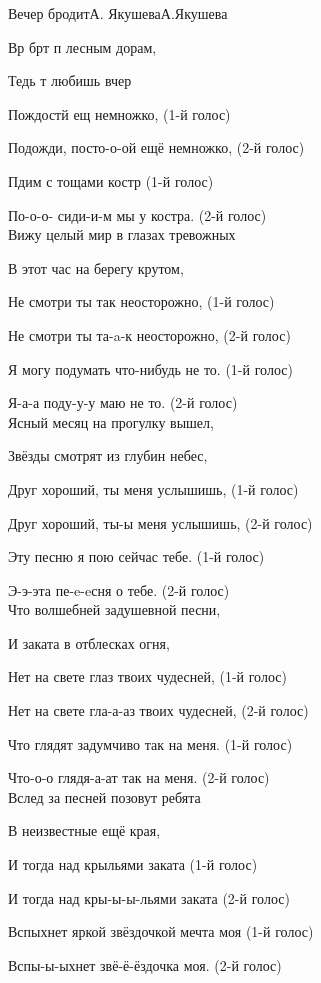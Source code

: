 \documentclass[11pt,a5paper]{book}
\begin{document}
\begin{song}{Вечер бродит}{}{А. Якушева}{А.Якушева}{}{}

Вр брт п лесным дорам,\par
Тедь т любишь вчер\par
Пождостй ещ немножко,    	(1-й голос)\par
Подожди, посто-о-ой ещё немножко,     							(2-й голос)\par
Пдим с тощами  костр  	(1-й голос)\par
По-о-о- сиди-и-м мы у костра.         							(2-й голос)\\
 
Вижу целый мир в глазах тревожных \par
В этот час на берегу крутом,\par
Не смотри ты так неосторожно,   	    (1-й голос)\par
Не смотри ты та-a-к неосторожно,     (2-й голос)\par
Я могу подумать что-нибудь не то.    (1-й голос)\par
Я-а-а поду-у-у маю не то.            (2-й голос)\\
 
Ясный месяц на прогулку вышел,\par
Звёзды смотрят из глубин небес,\par
Друг хороший, ты меня услышишь, 		(1-й голос)\par
Друг хороший, ты-ы меня услышишь, 	(2-й голос)\par
Эту песню я пою сейчас тебе. 		(1-й голос)\par
Э-э-эта пе-e-eсня о тебе. 			(2-й голос)\\
 
Что волшебней задушевной песни,\par
И заката в отблесках огня,\par
Нет на свете глаз твоих чудесней, 	(1-й голос)\par
Нет на свете гла-а-аз твоих чудесней, 	(2-й голос)\par
Что глядят задумчиво так на меня. 	(1-й голос)\par
Что-о-о глядя-а-ат так на меня. 		(2-й голос)\\
 
Вслед за песней позовут ребята\par
В неизвестные ещё края,\par
И тогда над крыльями заката           	(1-й голос)\par
И тогда над кры-ы-ы-льями заката    	(2-й голос)\par
Вспыхнет яркой звёздочкой мечта моя   (1-й голос)\par
Вспы-ы-ыхнет звё-ё-ёздочка моя.   	(2-й голос)\\
 

\end{song}
\end{document}
